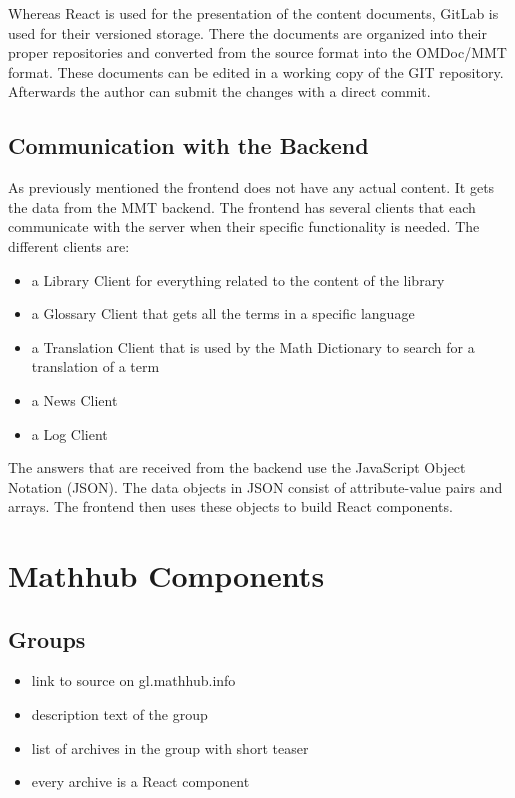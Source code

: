 \documentclass[11pt,a4paper]{article}
\begin{document}
Whereas React is used for the presentation of the content documents, GitLab is used for their versioned storage.
There the documents are organized into their proper repositories and converted from the source format into the OMDoc/MMT format.
These documents can be edited in a working copy of the GIT repository.
Afterwards the author can submit the changes with a direct commit.

\subsection{Communication with the Backend}

As previously mentioned the frontend does not have any actual content.
It gets the data from the MMT backend.
The frontend has several clients that each communicate with the server when their specific functionality is needed.
The different clients are:
\begin{itemize}
\item a Library Client for everything related to the content of the library
\item a Glossary Client that gets all the terms in a specific language
\item a Translation Client that is used by the Math Dictionary to search for a translation of a term 
\item a News Client
\item a Log Client
\end{itemize}

The answers that are received from the backend use the JavaScript Object Notation (JSON).
The data objects in JSON consist of attribute-value pairs and arrays.
The frontend then uses these objects to build React components.


\section{Mathhub Components}
\subsection{Groups}
\begin{itemize}
\item link to source on gl.mathhub.info
\item description text of the group
\item list of archives in the group with short teaser
\item every archive is a React component
\end{itemize}	 
	
\end{document}

